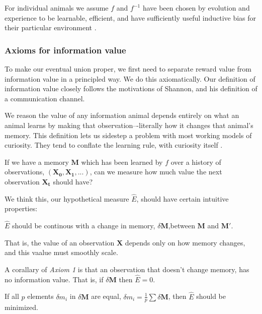 For individual animals we assume $f$ and $f^{-1}$ have been chosen by evolution and experience to be learnable, efficient, and have sufficiently useful inductive bias for their particular environment \cite{Valiant1984a,Thrun1992a}. 


\subsubsection*{Axioms for information value} 
To make our eventual union proper, we first need to separate reward value from information value in a principled way. We do this axiomatically. Our definition of information value closely follows the motivations of Shannon, and his definition of a communication channel. 

We reason the value of any information animal depends entirely on what an animal learns by making that observation–-literally how it changes that animal's memory. This definition lets us sidestep a problem with most working models of curiosity. They tend to conflate the learning rule, with curiosity itself \cite{Schmidhuber1991b,Oudeyer2018a,Burda2018,Zhang2013,deAbril2018,Zhou2020,Schwartenbeck2019,Wilson2014a,Lehman2011,Velez2014}.

If we have a memory $\mathbf{M}$ which has been learned by $f$ over a history of observations, $(\mathbf{X_0},\mathbf{X_1},...)$, can we measure how much value the next observation $\mathbf{X_t}$ should have? 

We think this, our hypothetical measure $\hat E$, should have certain intuitive properties:

\begin{axiom}
	$\hat E$ should be continous with a change in memory, $\delta \mathbf{M}$,between $\mathbf{M}$ and $\mathbf{M'}$.
\end{axiom}

That is, the value of an observation $\mathbf{X}$ depends only on how memory changes, and this vaalue must smoothly scale. 

A corallary of \emph{Axiom 1} is that an observation that doesn’t change memory, has no information value. That is, if $\delta \mathbf{M}$ then $\hat E = 0$.

\begin{axiom}
	If all $p$ elements $\delta m_i$ in $\delta \mathbf{M}$ are equal, $\delta m_i = \frac{1}{p} \sum \delta \mathbf{M}$, then $\hat E$ should be minimized.
\end{axiom}

